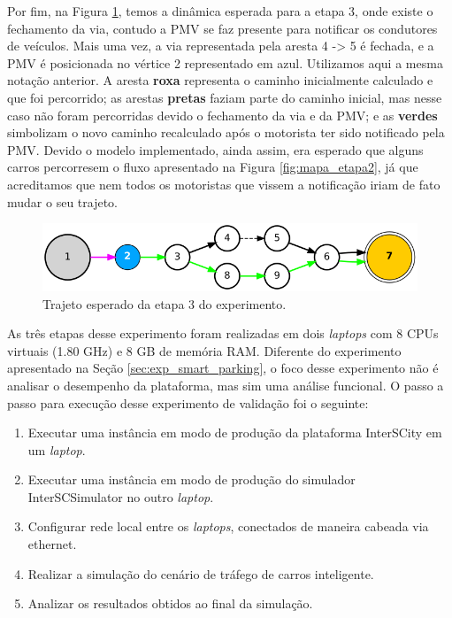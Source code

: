 Por fim, na Figura \ref{fig:mapa_etapa3}, temos a dinâmica esperada para a etapa 3, onde existe o fechamento da via, contudo a PMV se faz presente para notificar os condutores de veículos.
Mais uma vez, a via representada pela aresta 4 -> 5 é fechada, e a PMV é posicionada no vértice 2 representado em azul.
Utilizamos aqui a mesma notação anterior.
A aresta \textbf{roxa} representa o caminho inicialmente calculado e que foi percorrido;
as arestas \textbf{pretas} faziam parte do caminho inicial, mas nesse caso não foram percorridas devido o fechamento da via e da PMV;
e as \textbf{verdes} simbolizam o novo caminho recalculado após o motorista ter sido notificado pela PMV.
Devido o modelo implementado, ainda assim, era esperado que alguns carros percorresem o fluxo apresentado na Figura \ref{fig:mapa_etapa2}, já que acreditamos que nem todos os motoristas que vissem
a notificação iriam de fato mudar o seu trajeto.

\begin{figure}[ht]
	\centering
	\includegraphics[width=\textwidth]{figuras/mapa_etapa3.png}
	\caption{Trajeto esperado da etapa 3 do experimento.}
	\label{fig:mapa_etapa3}
\end{figure}

As três etapas desse experimento foram realizadas em dois \textit{laptops} com 8 CPUs virtuais (1.80 GHz) e 8 GB de memória RAM.
Diferente do experimento apresentado na Seção \ref{sec:exp_smart_parking}, o foco desse experimento não é analisar o desempenho da plataforma, mas sim uma análise funcional. 
O passo a passo para execução desse experimento de validação foi o seguinte:

\begin{enumerate}
    \item Executar uma instância em modo de produção da plataforma InterSCity em um \textit{laptop}.

    \item Executar uma instância em modo de produção do simulador InterSCSimulator no outro \textit{laptop}.

    \item Configurar rede local entre os \textit{laptops}, conectados de maneira cabeada via ethernet.

    \item Realizar a simulação do cenário de tráfego de carros inteligente.

    \item Analizar os resultados obtidos ao final da simulação.
\end{enumerate}

